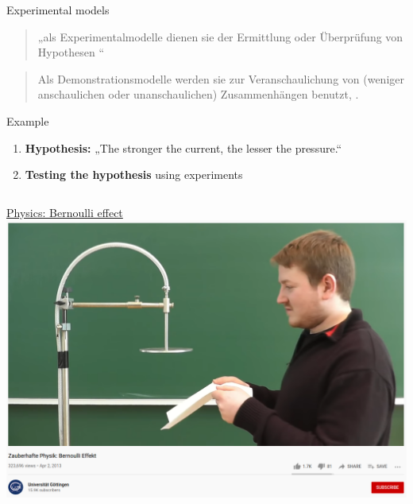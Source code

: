 \begin{frame}[allowframebreaks]{Experimental models}
\begin{quote}
„\punkti als Experimentalmodelle dienen sie der Ermittlung
oder Überprüfung von Hypothesen \punkti“~\parencite[139]{stachowiak}
\end{quote}
\begin{quote}
        Als Demonstrationsmodelle werden sie zur
Veranschaulichung von (weniger anschaulichen oder
unanschaulichen) Zusammenhängen benutzt, \punkti.~\parencite[138]{stachowiak}
\end{quote}\bigskip
    
    \begin{block}{Example}
    \begin{enumerate}\footnotesize
        \item \textbf{Hypothesis:} „The stronger the current, the lesser the pressure.“
        \item \textbf{Testing the hypothesis} using experiments
    \end{enumerate}
    \end{block}
    
    \framebreak
    
    \begin{columns}
    \begin{block}{}
        \href{https://youtu.be/K0aPuLn76H0}{Physics: Bernoulli effect}
    \includegraphics[width=\textwidth]{img/physik-bernoulli.png}
    \end{block}
    

\end{columns}
\end{frame}
